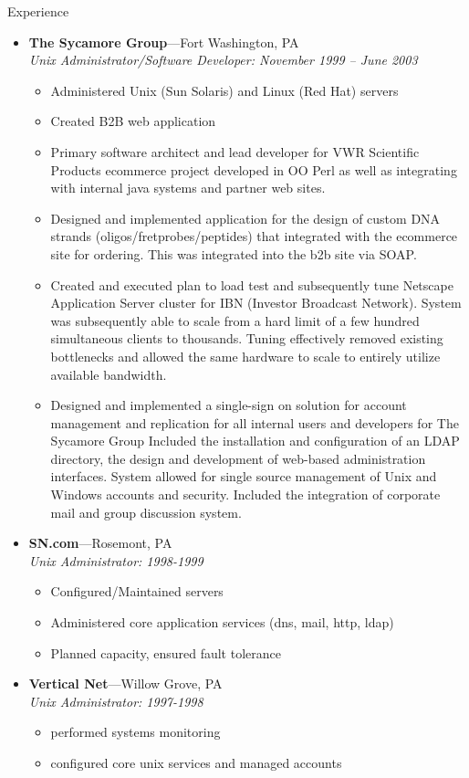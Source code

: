 \documentclass[11pt,oneside]{article}
\newenvironment{ressection}[1]{
        \vspace{4pt}
        {\fontfamily{phv}\selectfont\Large#1}
        \begin{itemize}
        \vspace{3pt}
}{
        \end{itemize}
}
\newcommand{\ressubitem}[1]{
        \vspace{-1pt}
        \item \begin{flushleft} #1 \end{flushleft}
}
\newcommand{\resbigitem}[3]{
        \vspace{-5pt}
        \item
        \textbf{#1}---#2 \\
        \textit{#3}
}
\newenvironment{ressubsec}[3]{
        \resbigitem{#1}{#2}{#3}
        \vspace{-2pt}
        \begin{itemize}
}{
        \end{itemize}
}
\begin{document}
\begin{ressection}{Experience}
\begin{ressubsec}{The Sycamore Group}{Fort Washington, PA}{Unix Administrator/Software Developer: November 1999 -- June 2003}
          \ressubitem{Administered Unix (Sun Solaris) and Linux (Red Hat) servers}

          \ressubitem{Created B2B web application}

          \ressubitem{Primary software architect and lead developer
            for VWR Scientific Products ecommerce project developed in
            OO Perl as well as integrating with internal java systems
            and partner web sites. }

          \ressubitem{Designed and implemented application for the
            design of custom DNA strands (oligos/fretprobes/peptides)
            that integrated with the ecommerce site for ordering. This
            was integrated into the b2b site via SOAP.}

          \ressubitem{Created and executed plan to load test and
            subsequently tune Netscape Application Server cluster for
            IBN (Investor Broadcast Network). System was subsequently
            able to scale from a hard limit of a few hundred
            simultaneous clients to thousands. Tuning effectively
            removed existing bottlenecks and allowed the same hardware
            to scale to entirely utilize available bandwidth. }

          \ressubitem{Designed and implemented a single-sign on
            solution for account management and replication for all
            internal users and developers for The Sycamore Group
            Included the installation and configuration of an LDAP
            directory, the design and development of web-based
            administration interfaces. System allowed for single
            source management of Unix and Windows accounts and
            security. Included the integration of corporate mail and
            group discussion system. }

        \end{ressubsec}

        \begin{ressubsec}{SN.com}{Rosemont, PA}{Unix Administrator: 1998-1999}

          \ressubitem{Configured/Maintained servers}

          \ressubitem{Administered core application services (dns, mail, http, ldap)}

          \ressubitem{Planned capacity, ensured fault tolerance}

        \end{ressubsec}

        \begin{ressubsec}{Vertical Net}{Willow Grove, PA}{Unix Administrator: 1997-1998}

          \ressubitem{performed systems monitoring}

          \ressubitem{configured core unix services and managed accounts}

        \end{ressubsec}

\end{ressection}
\end{document}
